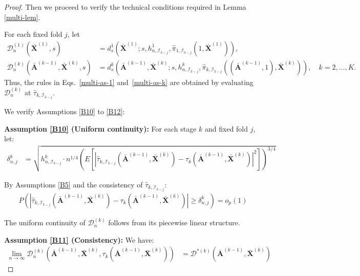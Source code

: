 \documentclass[11pt]{article}
\theoremstyle{referenceplain}
\theoremstyle{referencedefinition}
\theoremstyle{referenceremark}
\begin{document}
\begin{proof}

Then we proceed to verify the technical conditions required in Lemma \ref{multi-lem}.

{
For each fixed fold $j$, let
\begin{align*}
\mathcal{D}_n^{(1)}(\bar{\mathbf{X}}^{(1)},s)
&=d_s^1\!\left(\bar{\mathbf{X}}^{(1)};s,h_{n,\mathcal I_{3-j}}^1,
\widehat\pi_{1,\mathcal I_{3-j}}(1,\bar{\mathbf X}^{(1)})\right),\\
\mathcal{D}_n^{(k)}(\bar{\mathbf{A}}^{(k-1)},\bar{\mathbf{X}}^{(k)},s)
&=d_s^k\!\left(\bar{\mathbf{A}}^{(k-1)},\bar{\mathbf{X}}^{(k)};s,h_{n,\mathcal I_{3-j}}^k,
\widehat\pi_{k,\mathcal I_{3-j}}((\bar{\mathbf A}^{(k-1)},1),\bar{\mathbf X}^{(k)})\right),\quad k=2,\dots,K.
\end{align*}
Thus, the rules in Eqs.~\eqref{multi-as-1} and~\eqref{multi-as-k} are obtained by evaluating $\mathcal D_n^{(k)}$ at $\widehat\tau_{k,\mathcal I_{3-j}}$.
}

We verify Assumptions \ref{B10} to \ref{B12}:

\textbf{Assumption \ref{B10} (Uniform continuity):}
For each stage $k$ {and fixed fold $j$}, let:
\begin{align*}
    {\delta_{n,j}^k} &= \sqrt{h_{n,\mathcal{I}_{3-j}}^k \cdot n^{1/4}\left(E[|\widehat{\tau}_{k,\mathcal{I}_{3-j}}(\bar{\mathbf{A}}^{(k-1)},\bar{\mathbf{X}}^{(k)}) - \tau_k(\bar{\mathbf{A}}^{(k-1)},\bar{\mathbf{X}}^{(k)})|^2]\right)^{3/4}}
\end{align*}

By Assumptions \ref{B5} and the consistency of $\widehat{\tau}_{k,\mathcal{I}_{3-j}}$:
\begin{align*}
    P(|\widehat{\tau}_{k,\mathcal{I}_{3-j}}(\bar{\mathbf{A}}^{(k-1)},\bar{\mathbf{X}}^{(k)}) - \tau_k(\bar{\mathbf{A}}^{(k-1)},\bar{\mathbf{X}}^{(k)})| \geq {\delta_{n,j}^k}) = o_p(1)
\end{align*}

The uniform continuity of {$\mathcal{D}_n^{(k)}$} follows from its {piecewise} linear structure.

\textbf{Assumption \ref{B11} (Consistency):}
We have:
\begin{align*}
    \lim_{n \to \infty} {\mathcal{D}_n^{(k)}}(\bar{\mathbf{A}}^{(k-1)},\bar{\mathbf{X}}^{(k)},\tau_k(\bar{\mathbf{A}}^{(k-1)},\bar{\mathbf{X}}^{(k)})) &= \mathcal{D}^{*(k)}(\bar{\mathbf{A}}^{(k-1)},\bar{\mathbf{X}}^{(k)})
\end{align*}


\end{proof}
\end{document}
